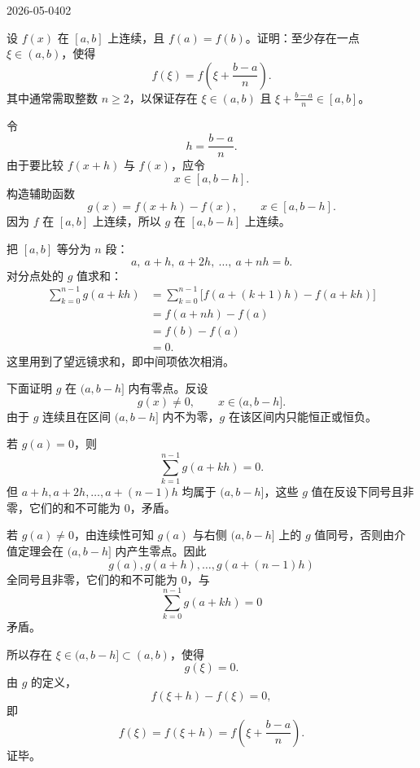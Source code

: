 \begin{mistake}{2026-05-04}{02}

\begin{problemcontent}
设 \(f(x)\) 在 \([a,b]\) 上连续，且 \(f(a)=f(b)\)。证明：至少存在一点 \(\xi\in(a,b)\)，使得
\[
f(\xi)=f\left(\xi+\frac{b-a}{n}\right).
\]
其中通常需取整数 \(n\ge 2\)，以保证存在 \(\xi\in(a,b)\) 且 \(\xi+\frac{b-a}{n}\in[a,b]\)。
\end{problemcontent}

\begin{solutioncontent}
令
\[
h=\frac{b-a}{n}.
\]
由于要比较 \(f(x+h)\) 与 \(f(x)\)，应令
\[
x\in[a,b-h].
\]
构造辅助函数
\[
g(x)=f(x+h)-f(x),\qquad x\in[a,b-h].
\]
因为 \(f\) 在 \([a,b]\) 上连续，所以 \(g\) 在 \([a,b-h]\) 上连续。

把 \([a,b]\) 等分为 \(n\) 段：
\[
a,\ a+h,\ a+2h,\ \ldots,\ a+nh=b.
\]
对分点处的 \(g\) 值求和：
\[
\begin{aligned}
\sum_{k=0}^{n-1}g(a+kh)
&=\sum_{k=0}^{n-1}\bigl[f(a+(k+1)h)-f(a+kh)\bigr]\\
&=f(a+nh)-f(a)\\
&=f(b)-f(a)\\
&=0.
\end{aligned}
\]
这里用到了望远镜求和，即中间项依次相消。

下面证明 \(g\) 在 \((a,b-h]\) 内有零点。反设
\[
g(x)\ne0,\qquad x\in(a,b-h].
\]
由于 \(g\) 连续且在区间 \((a,b-h]\) 内不为零，\(g\) 在该区间内只能恒正或恒负。

若 \(g(a)=0\)，则
\[
\sum_{k=1}^{n-1}g(a+kh)=0.
\]
但 \(a+h,a+2h,\ldots,a+(n-1)h\) 均属于 \((a,b-h]\)，这些 \(g\) 值在反设下同号且非零，它们的和不可能为 \(0\)，矛盾。

若 \(g(a)\ne0\)，由连续性可知 \(g(a)\) 与右侧 \((a,b-h]\) 上的 \(g\) 值同号，否则由介值定理会在 \((a,b-h]\) 内产生零点。因此
\[
g(a),g(a+h),\ldots,g(a+(n-1)h)
\]
全同号且非零，它们的和不可能为 \(0\)，与
\[
\sum_{k=0}^{n-1}g(a+kh)=0
\]
矛盾。

所以存在 \(\xi\in(a,b-h]\subset(a,b)\)，使得
\[
g(\xi)=0.
\]
由 \(g\) 的定义，
\[
f(\xi+h)-f(\xi)=0,
\]
即
\[
f(\xi)=f(\xi+h)=f\left(\xi+\frac{b-a}{n}\right).
\]
证毕。
\end{solutioncontent}


\end{mistake}
